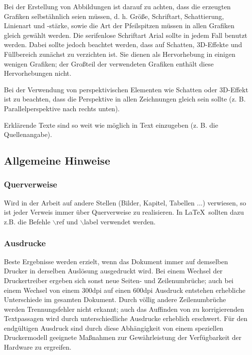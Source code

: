 \documentclass[11pt]{scrartcl}
\begin{document}
Bei der Erstellung von Abbildungen ist darauf zu achten, dass die erzeugten Grafiken selbstähnlich seien müssen, d. h. Größe, Schriftart, Schattierung, Linienart und -stärke, sowie die Art der Pfeilspitzen müssen in allen Grafiken gleich gewählt werden. Die serifenlose Schriftart Arial sollte in jedem Fall benutzt werden. Dabei sollte jedoch beachtet werden, dass auf Schatten, 3D-Effekte  und Füllbereich zunächst zu verzichten ist. Sie dienen als Hervorhebung in einigen wenigen Grafiken; der Großteil der verwendeten Grafiken enthält diese Hervorhebungen nicht.

Bei der Verwendung von perspektivischen Elementen wie Schatten oder 3D-Effekt ist zu beachten, dass die Perspektive in allen Zeichnungen gleich sein sollte (z. B. Parallelperspektive nach rechts unten).

Erklärende Texte sind so weit wie möglich in Text einzugeben (z. B. die Quellenangabe).
 
\subsection{Allgemeine Hinweise}
\subsubsection{Querverweise}

Wird in der Arbeit auf andere Stellen (Bilder, Kapitel, Tabellen ...) verwiesen, so ist jeder Verweis immer über Querverweise zu realisieren. In \LaTeX\  sollten dazu z.B. die Befehle $\backslash$ref und $\backslash$label verwendet werden.

\subsubsection{Ausdrucke}

Beste Ergebnisse werden erzielt, wenn das Dokument immer auf demselben Drucker in derselben Auslösung ausgedruckt wird. Bei einem Wechsel der Druckertreiber ergeben sich sonst neue Seiten- und Zeilenumbrüche; auch bei einem Wechsel von einem 300dpi auf einen 600dpi Ausdruck entstehen erhebliche Unterschiede im gesamten Dokument. Durch völlig andere Zeilenumbrüche werden Trennungsfehler nicht erkannt; auch das Auffinden von zu korrigierenden Textpassagen wird durch unterschiedliche Ausdrucke erheblich erschwert. Für den endgültigen Ausdruck sind durch diese Abhängigkeit von einem speziellen Druckermodell geeignete Maßnahmen zur Gewährleistung der Verfügbarkeit  der Hardware zu ergreifen.
\end{document}
